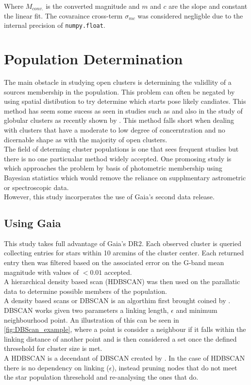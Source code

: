Where $M_{conv.}$ is the converted magnitude and $m$ and $c$ are the slope and constant the linear fit. The covaraince cross-term $\sigma_{mc}$ was considered negligble due to the internal precision of \verb|numpy.float|.

\section{Population Determination}

The main obstacle in studying open clusters is determining the validlity of a sources membership in the population. This problem can often be negated by using spatial distibution to try determine which starts pose likely candiates. This method has seem some sucess as seen in studies such as \cite{2006A&A...456..523S} and also in the study of globular clusters as recently shown by \cite{2022A&A...658A.141V}. This method falls short when dealing with clusters that have a moderate to low degree of concerntration and no dicernable shape as with the majority of open clusters. \\  The field of determing cluster populations is one that sees frequent studies but there is no one particualar method widely accepted. One promosing study is \cite{2018A&A...609A..36S} which approaches the problem by basis of photometric membership using Bayesian statistics which would remove the reliance on supplmentary astrometric or spectroscopic data. \\ 
However, this study incorperates the use of Gaia's second data release.


\subsection{Using Gaia}
This study takes full advantage of Gaia's DR2. Each observed cluster is queried collecting entries for stars within 10 arcmins of the cluster center. Each returned entry then was filtered based on the associated error on the G-band mean magnitude with values of $< 0.01$ accepted. \\ A hierarchical density based scan (HDBSCAN) was then used on the parallatic data to determine possible members of the population. \\ 
A density based scans or DBSCAN is an algorthim first brought coined by \cite{Ester96adensity-based}. DBSCAN works given two parameters a linking length, $\epsilon$ and minimum neighbourhood point. An illustration of this can be seen in \cref{fig:DBScan_example}, where a point is consider a neighbour if it falls within the linking distance of another point and is then considered a set once the defined thresehold for cluster size is met. \\ A HDBSCAN is a decendant of DBSCAN created by \cite{HBSCAN_Campello}. In the case of HDBSCAN there is no dependency on linking ($\epsilon$), instead pruning nodes that do not meet the star population thresehold and re-analysing the ones that do. 

